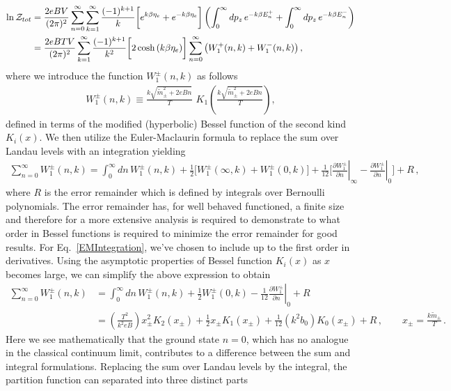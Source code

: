 \documentclass[Universe,article,submit,moreauthors,pdftex]{Definitions/mdpi}
\newcommand*{\req}[1]{Eq.~{\eqref{#1}}}
\begin{document}
\begin{align}
  \label{PartTotal}\ln\mathcal{Z}_{tot}
  &=\frac{2eBV}{(2\pi)^2}\sum_{n=0}^\infty\sum^{\infty}_{k=1}\frac{(-1)^{k+1}}{k}\bigg[e^{k\beta\eta_{e}}+e^{-k\beta\eta_{e}}\bigg]\left(\int_0^\infty dp_z\,e^{-k\beta E_n^+}+\int_0^\infty dp_z\,e^{-k\beta E_n^-}\right)\notag\\
  &=\frac{2eBTV}{(2\pi)^2}\sum^{\infty}_{k=1}\frac{(-1)^{k+1}}{k^2}\bigg[2\cosh{(k\beta\eta_{e})}\bigg]\sum_{n=0}^\infty \left(W^+_1(n,k)+ W^-_1(n,k)\right),
\end{align}
where we introduce the function $W^\pm_1(n,k)$ as follows
\begin{align}
W^\pm_1(n,k)\equiv\frac{k\sqrt{\tilde{m}^2_\pm+2eBn}}{T}\,\,K_1\!\!\left(\frac{k\sqrt{\tilde{m}^2_\pm+2eBn}}{T}\right),
\end{align}
defined in terms of the modified (hyperbolic) Bessel function of the second kind $K_{i}(x)$. We then utilize the Euler-Maclaurin formula to replace the sum over Landau levels with an integration yielding
\begin{align}
\label{EMIntegration}\sum^{\infty}_{n=0}W^\pm_1(n,k)=\int^\infty_0\!\!dn\,W^\pm_1(n,k)+\frac{1}{2}\bigg[W^\pm_1(\infty,k)+W^\pm_1(0,k)\bigg]+\frac{1}{12}\bigg[\left.\frac{\partial W^\pm_1}{\partial n}\right|_{\infty}-\left.\frac{\partial W^\pm_1}{\partial n}\right|_{0}\bigg]+R\,,
\end{align}
where $R$ is the error remainder which is defined by integrals over Bernoulli polynomials. The error remainder has, for well behaved functioned, a finite size and therefore for a more extensive analysis is required to demonstrate to what order in Bessel functions is required to minimize the error remainder for good results. For \req{EMIntegration}, we've chosen to include up to the first order in derivatives. Using the asymptotic properties of Bessel function $K_{i}(x)$ as $x$ becomes large, we can simplify the above expression to obtain
\begin{align}
\label{Winitial}\sum^{\infty}_{n=0}W^\pm_1(n,k)&=\int^\infty_0\!\!dn\,W^\pm_1(n,k)+\frac{1}{2}W^\pm_1(0,k)-\frac{1}{12}\left.\frac{\partial W^\pm_1}{\partial n}\right|_{0}+R\\
\label{WReplacement}
&=\left(\frac{T^2}{k^2eB}\right)x_{\pm}^{2}K_{2}(x_{\pm})+\frac{1}{2}x_{\pm}K_{1}(x_{\pm})+\frac{1}{12}\left(k^2b_0\right)K_{0}(x_{\pm})+R\,,\qquad x_{\pm} = \frac{k\tilde{m}_{\pm}}{T}\,.
\end{align}
Here we see mathematically that the ground state $n=0$, which has no analogue in the classical continuum limit, contributes to a difference between the sum and integral formulations. Replacing the sum over Landau levels by the integral, the partition function can separated into three distinct parts
\end{document}
